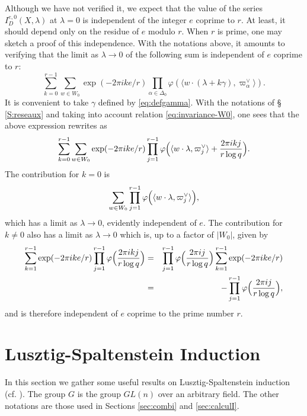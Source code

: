 \begin{paragr}
\begin{paragr}
\begin{remarque}\label{rq:mobius}
Although we have not verified it, we expect that the value of the series $I^{e,0}_D(X,\lambda)$ at $\lambda=0$ is independent of the integer $e$ coprime to $r$. At least, it should depend only on the residue of $e$ modulo $r$. When $r$ is prime, one may sketch a proof of this independence. With the notations above, it amounts to verifying that the limit as $\lambda\to 0$ of the following sum is independent of $e$ coprime to $r$:
$$\sum_{k=0}^{r-1} \sum_{w\in W_0}  \exp(-2\pi i k e/r) \prod_{\alpha\in \Delta_0} \varphi( \langle  w\cdot(\lambda+k\gamma),\varpi_\alpha^\vee\rangle ).$$
It is convenient to take $\gamma$ defined by \eqref{eq:defgamma}. With the notations of \S\,\ref{S:reseaux} and taking into account relation \eqref{eq:invariance-W0}, one sees that the above expression rewrites as
$$\sum_{k=0}^{r-1} \sum_{w\in W_0}  \exp(-2\pi i k e/r) \prod_{j=1}^{r-1} \varphi\Bigl( \langle  w\cdot\lambda ,\varpi_j^\vee\rangle    + \frac{2\pi i k j }{r\log q }\Bigr).$$
The contribution for $k=0$ is
$$\sum_{w\in W_0}  \prod_{j=1}^{r-1} \varphi\Bigl( \langle  w\cdot\lambda ,\varpi_j^\vee\rangle\Bigr),$$
which has a limit as $\lambda\to 0$, evidently independent of $e$. The contribution for $k\not=0$ also has a limit as $\lambda\to 0$ which is, up to a factor of $|W_0|$, given by
\begin{eqnarray*}
  \sum_{k=1}^{r-1}   \exp(-2\pi i k e/r) \prod_{j=1}^{r-1} \varphi\Bigl( \frac{2\pi i k j }{r\log q }\Bigr)
  &=& \prod_{j=1}^{r-1} \varphi\Bigl( \frac{2\pi i j }{r\log q }\Bigr)  \sum_{k=1}^{r-1}   \exp(-2\pi i k e/r)\\
  &=& - \prod_{j=1}^{r-1} \varphi\Bigl( \frac{2\pi i j }{r\log q }\Bigr),
\end{eqnarray*}
and is therefore independent of $e$ coprime to the prime number $r$.
\end{remarque}

\end{paragr}
\end{paragr}

\section{Lusztig-Spaltenstein Induction}\label{sec:induction}

\begin{paragr}
In this section we gather some useful results on Lusztig-Spaltenstein induction (cf. \cite{lus-spal}). The group $G$ is the group $GL(n)$ over an arbitrary field. The other notations are those used in Sections \ref{sec:combi} and \ref{sec:calculI}.
\end{paragr}

